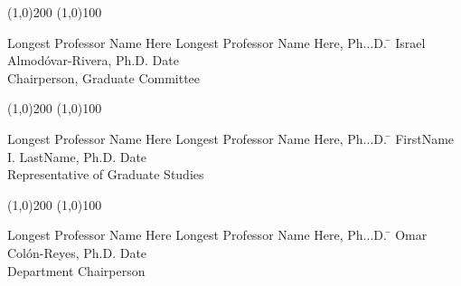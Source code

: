   \noindent
\line(1,0){200} \hspace{40 mm} \line(1,0){100}\\
  \noindent
\vspace{-1.75\baselineskip}
  \begin{tabbing}
Longest Professor Name Here Longest Professor Name Here, Ph...D.   \=  \kill 
Israel Almodóvar-Rivera, Ph.D. \>  Date\\Chairperson, Graduate Committee %
\end{tabbing}



  \noindent
\line(1,0){200} \hspace{40 mm} \line(1,0){100}\\
  \noindent
\vspace{-1.75\baselineskip}
  \begin{tabbing}
Longest Professor Name Here Longest Professor Name Here, Ph...D.  \=  \kill 
FirstName I. LastName, Ph.D. \>  Date\\Representative of Graduate Studies  %
\end{tabbing}


  \noindent
  \line(1,0){200} \hspace{40 mm} \line(1,0){100}\\
  \noindent
\vspace{-1.75\baselineskip}
  \begin{tabbing}
Longest Professor Name Here Longest Professor Name Here, Ph...D.  \=  \kill 
Omar Colón-Reyes, Ph.D. \>  Date\\Department Chairperson  %
\end{tabbing}
